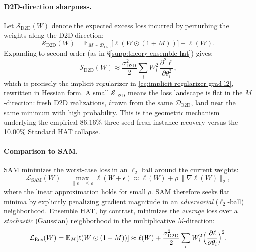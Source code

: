 \paragraph{D2D-direction sharpness.} Let $\mathcal{S}_{\text{D2D}}(W)$ denote the expected excess loss incurred by perturbing the weights along the D2D direction:
\begin{equation}
    \mathcal{S}_{\text{D2D}}(W)
    = \mathbb{E}_{M\sim\mathcal{D}_{\text{D2D}}}\!\bigl[\ell(W\odot(1+M))\bigr] - \ell(W).
    \label{eq:d2d-sharpness}
\end{equation}
Expanding to second order (as in \S\ref{supp:theory-ensemble-hat}) gives:
\begin{equation}
    \mathcal{S}_{\text{D2D}}(W)
    \approx \frac{\sigma_{\text{D2D}}^2}{2}\sum_i W_i^2\,\frac{\partial^2\ell}{\partial\theta_i^2},
    \label{eq:d2d-sharpness-second}
\end{equation}
which is precisely the implicit regularizer in \eqref{eq:implicit-regularizer-grad-l2}, rewritten in Hessian form. A small $\mathcal{S}_{\text{D2D}}$ means the loss landscape is flat in the $M$-direction: fresh D2D realizations, drawn from the same $\mathcal{D}_{\text{D2D}}$, land near the same minimum with high probability. This is the geometric mechanism underlying the empirical 86.16\% three-seed fresh-instance recovery versus the 10.00\% Standard HAT collapse.

\paragraph{Comparison to SAM.} SAM \citep{foret2021sharpness} minimizes the worst-case loss in an $\ell_2$ ball around the current weights:
\begin{equation}
    \mathcal{L}_{\text{SAM}}(W)
    = \max_{\|\epsilon\|\leq\rho} \ell(W + \epsilon)
    \approx \ell(W) + \rho\,\|\nabla\ell(W)\|_2,
    \label{eq:sam-objective}
\end{equation}
where the linear approximation holds for small $\rho$. SAM therefore seeks flat minima by explicitly penalizing gradient magnitude in an \emph{adversarial} ($\ell_2$-ball) neighborhood. Ensemble HAT, by contrast, minimizes the \emph{average} loss over a \emph{stochastic} (Gaussian) neighborhood in the multiplicative $M$-direction:
\begin{equation}
    \mathcal{L}_{\text{Ens}}(W)
    = \mathbb{E}_M[\ell(W\odot(1+M))]
    \approx \ell(W) + \frac{\sigma_{\text{D2D}}^2}{2}\sum_i W_i^2\Bigl(\frac{\partial\ell}{\partial\theta_i}\Bigr)^2.
    \label{eq:ens-flatness}
\end{equation}

